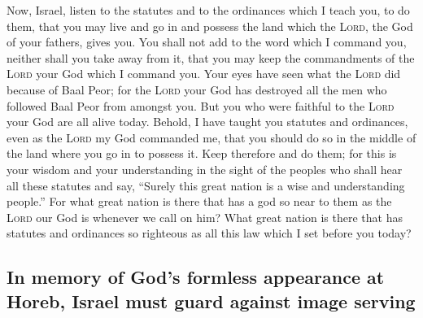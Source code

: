 Now, Israel, listen to the statutes and to the ordinances
which I teach you, to do them, that you may live and go in and possess
the land which the \textsc{Lord}, the God of your fathers, gives you.
 You shall not add to the word which I command you,
neither shall you take away from it, that you may keep the commandments
of the \textsc{Lord} your God which I command you.  Your
eyes have seen what the \textsc{Lord} did because of Baal Peor; for the
\textsc{Lord} your God has destroyed all the men who followed Baal Peor
from amongst you.  But you who were faithful to the
\textsc{Lord} your God are all alive today.  Behold, I
have taught you statutes and ordinances, even as the \textsc{Lord} my
God commanded me, that you should do so in the middle of the land where
you go in to possess it.  Keep therefore and do them; for
this is your wisdom and your understanding in the sight of the peoples
who shall hear all these statutes and say, ``Surely this great nation is
a wise and understanding people.''  For what great nation
is there that has a god so near to them as the \textsc{Lord} our God is
whenever we call on him?  What great nation is there that
has statutes and ordinances so righteous as all this law which I set
before you today?

\hypertarget{in-memory-of-gods-formless-appearance-at-horeb-israel-must-guard-against-image-serving}{%
\subsection{In memory of God's formless appearance at Horeb, Israel must
guard against image
serving}\label{in-memory-of-gods-formless-appearance-at-horeb-israel-must-guard-against-image-serving}}

